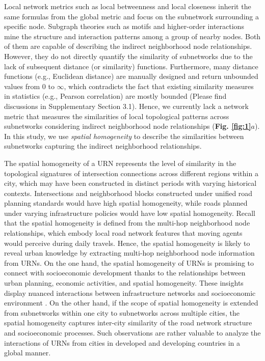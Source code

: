 \documentclass[10pt]{wlscirep}
\begin{document}
Local network metrics such as local betweenness\cite{thadakamalla2005search,jeong2007low,ahmadzai2019assessment,nigam2021local} and local closeness\cite{porta2012street,ahmadzai2019assessment,mahyar2019compressive} inherit the same formulas from the global metric and focus on the subnetwork surrounding a specific node. Subgraph theories such as motifs \cite{schneider2013unravelling,dey2019network} and higher-order interactions\cite{benson2018simplicial} mine the structure and interaction patterns among a group of nearby nodes. Both of them are capable of describing the indirect neighborhood node relationships. However, they do not directly quantify the similarity of subnetworks due to the lack of subsequent distance (or similarity) functions. Furthermore, many distance functions (e.g., Euclidean distance) are manually designed and return unbounded values from 0 to $\infty$, which contradicts the fact that existing similarity measures in statistics (e.g., Pearson correlation) are mostly bounded (Please find discussions in Supplementary Section 3.1). Hence, we currently lack a network metric that measures the similarities of local topological patterns across subnetworks considering indirect neighborhood node relationships (\textbf{Fig. \ref{fig:1}$a$}).
In this study, we use \textit{spatial homogeneity} to describe the similarities between subnetworks capturing the indirect neighborhood relationships.

The spatial homogeneity of a URN represents the level of similarity in the topological signatures of intersection connections across different regions within a city, which may have been constructed in distinct periods with varying historical contexts. Intersections and neighborhood blocks constructed under unified road planning standards would have high spatial homogeneity, while roads planned under varying infrastructure policies would have low spatial homogeneity. Recall that the spatial homogeneity is defined from the multi-hop neighborhood node relationships, which embody local road network features that moving agents would perceive during daily travels. Hence, the spatial homogeneity is likely to reveal urban knowledge by extracting multi-hop neighborhood node information from URNs. On the one hand, the spatial homogeneity of URNs is promising to connect with socioeconomic development thanks to the relationships between urban planning, economic activities, and spatial homogeneity. These insights display nuanced interactions between infrastructure networks and socioeconomic environment \cite{chandra2000does, molinero2021geometry}. On the other hand, if the scope of spatial homogeneity is extended from subnetworks within one city to subnetworks across multiple cities, the spatial homogeneity captures inter-city similarity \cite{currid2010two} of the road network structure and socioeconomic processes. Such observations are rather valuable to analyze the interactions of URNs from cities in developed and developing countries in a global manner. 
\end{document}
